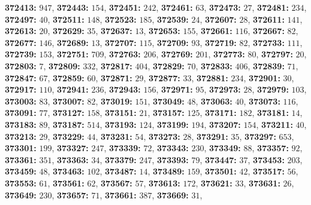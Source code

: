 \textsf{\bfseries 372413:} $947$, \textsf{\bfseries 372443:} $154$, \textsf{\bfseries 372451:} $242$, \textsf{\bfseries 372461:} $63$, \textsf{\bfseries 372473:} $27$, \textsf{\bfseries 372481:} $234$, \textsf{\bfseries 372497:} $40$, \textsf{\bfseries 372511:} $148$, \textsf{\bfseries 372523:} $185$, \textsf{\bfseries 372539:} $24$, \textsf{\bfseries 372607:} $28$, \textsf{\bfseries 372611:} $141$, \textsf{\bfseries 372613:} $20$, \textsf{\bfseries 372629:} $35$, \textsf{\bfseries 372637:} $13$, \textsf{\bfseries 372653:} $155$, \textsf{\bfseries 372661:} $116$, \textsf{\bfseries 372667:} $82$, \textsf{\bfseries 372677:} $146$, \textsf{\bfseries 372689:} $13$, \textsf{\bfseries 372707:} $115$, \textsf{\bfseries 372709:} $93$, \textsf{\bfseries 372719:} $82$, \textsf{\bfseries 372733:} $111$, \textsf{\bfseries 372739:} $153$, \textsf{\bfseries 372751:} $709$, \textsf{\bfseries 372763:} $206$, \textsf{\bfseries 372769:} $201$, \textsf{\bfseries 372773:} $80$, \textsf{\bfseries 372797:} $20$, \textsf{\bfseries 372803:} $7$, \textsf{\bfseries 372809:} $332$, \textsf{\bfseries 372817:} $404$, \textsf{\bfseries 372829:} $70$, \textsf{\bfseries 372833:} $406$, \textsf{\bfseries 372839:} $71$, \textsf{\bfseries 372847:} $67$, \textsf{\bfseries 372859:} $60$, \textsf{\bfseries 372871:} $29$, \textsf{\bfseries 372877:} $33$, \textsf{\bfseries 372881:} $234$, \textsf{\bfseries 372901:} $30$, \textsf{\bfseries 372917:} $110$, \textsf{\bfseries 372941:} $236$, \textsf{\bfseries 372943:} $156$, \textsf{\bfseries 372971:} $95$, \textsf{\bfseries 372973:} $28$, \textsf{\bfseries 372979:} $103$, \textsf{\bfseries 373003:} $83$, \textsf{\bfseries 373007:} $82$, \textsf{\bfseries 373019:} $151$, \textsf{\bfseries 373049:} $48$, \textsf{\bfseries 373063:} $40$, \textsf{\bfseries 373073:} $116$, \textsf{\bfseries 373091:} $77$, \textsf{\bfseries 373127:} $158$, \textsf{\bfseries 373151:} $21$, \textsf{\bfseries 373157:} $125$, \textsf{\bfseries 373171:} $182$, \textsf{\bfseries 373181:} $14$, \textsf{\bfseries 373183:} $89$, \textsf{\bfseries 373187:} $514$, \textsf{\bfseries 373193:} $124$, \textsf{\bfseries 373199:} $194$, \textsf{\bfseries 373207:} $154$, \textsf{\bfseries 373211:} $40$, \textsf{\bfseries 373213:} $29$, \textsf{\bfseries 373229:} $44$, \textsf{\bfseries 373231:} $54$, \textsf{\bfseries 373273:} $28$, \textsf{\bfseries 373291:} $35$, \textsf{\bfseries 373297:} $653$, \textsf{\bfseries 373301:} $199$, \textsf{\bfseries 373327:} $247$, \textsf{\bfseries 373339:} $72$, \textsf{\bfseries 373343:} $230$, \textsf{\bfseries 373349:} $88$, \textsf{\bfseries 373357:} $92$, \textsf{\bfseries 373361:} $351$, \textsf{\bfseries 373363:} $34$, \textsf{\bfseries 373379:} $247$, \textsf{\bfseries 373393:} $79$, \textsf{\bfseries 373447:} $37$, \textsf{\bfseries 373453:} $203$, \textsf{\bfseries 373459:} $48$, \textsf{\bfseries 373463:} $102$, \textsf{\bfseries 373487:} $14$, \textsf{\bfseries 373489:} $159$, \textsf{\bfseries 373501:} $42$, \textsf{\bfseries 373517:} $56$, \textsf{\bfseries 373553:} $61$, \textsf{\bfseries 373561:} $62$, \textsf{\bfseries 373567:} $57$, \textsf{\bfseries 373613:} $172$, \textsf{\bfseries 373621:} $33$, \textsf{\bfseries 373631:} $26$, \textsf{\bfseries 373649:} $230$, \textsf{\bfseries 373657:} $71$, \textsf{\bfseries 373661:} $387$, \textsf{\bfseries 373669:} $31$, 
